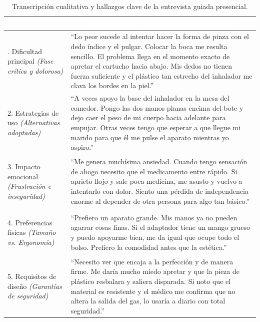 \documentclass[11pt,a4paper]{article}
\begin{document}
\begin{table}[H]
    \centering
    \small
    \renewcommand{\arraystretch}{1.6}
    \renewcommand{\tabularxcolumn}[1]{m{#1}}
    \begin{tabularx}{\linewidth}{|>{\columncolor{ArthroTeal!5}\bfseries\raggedright\arraybackslash}m{4.5cm} | X|}
        \hline
        \rowcolor{ArthroNavy}
        \multicolumn{1}{|c|}{\textcolor{white}{\textbf{Foco de la Pregunta}}} & \multicolumn{1}{c|}{\textcolor{white}{\textbf{Experiencia de Uso (Transcripción literal)}}} \\ \hline
        
        1. Dificultad principal \newline \textit{(Fase crítica y dolorosa)} & 
        ``Lo peor sucede al intentar hacer la forma de pinza con el dedo índice y el pulgar. Colocar la boca me resulta sencillo. El problema llega en el momento exacto de apretar el cartucho hacia abajo. Mis dedos no tienen fuerza suficiente y el plástico tan estrecho del inhalador me clava los bordes en la piel.'' \\ \hline
        
        2. Estrategias de uso \newline \textit{(Alternativas adoptadas)} & 
        ``A veces apoyo la base del inhalador en la mesa del comedor. Pongo las dos manos planas encima del bote y dejo caer el peso de mi cuerpo hacia adelante para empujar. Otras veces tengo que esperar a que llegue mi marido para que él me pulse el aparato mientras yo aspiro.'' \\ \hline
        
        3. Impacto emocional \newline \textit{(Frustración e inseguridad)} & 
        ``Me genera muchísima ansiedad. Cuando tengo sensación de ahogo necesito que el medicamento entre rápido. Si aprieto flojo y sale poca medicina, me asusto y vuelvo a intentarlo con dolor. Siento una pérdida de independencia enorme al depender de otra persona para algo tan básico.'' \\ \hline
        
        4. Preferencias físicas \newline \textit{(Tamaño vs. Ergonomía)} & 
        ``Prefiero un aparato grande. Mis manos ya no pueden agarrar cosas finas. Si el adaptador tiene un mango grueso y puedo apoyarme bien, me da igual que ocupe todo el bolso. Prefiero la comodidad antes que la estética.'' \\ \hline
        
        5. Requisitos de diseño \newline \textit{(Garantías de seguridad)} & 
        ``Necesito ver que encaja a la perfección y de manera firme. Me daría mucho miedo apretar y que la pieza de plástico resbalara y saliera disparada. Si noto que el material es resistente y el médico me confirma que no altera la salida del gas, lo usaría a diario con total seguridad.'' \\ \hline
    \end{tabularx}
    \caption{Transcripción cualitativa y hallazgos clave de la entrevista guiada presencial.}
    \label{tab:resultados_entrevista}
\end{table}
\newpage
\end{document}

